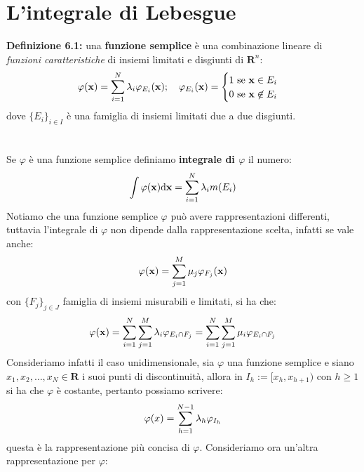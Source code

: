\documentclass{article}
\begin{document}
\section{L'integrale di Lebesgue}
\textbf{Definizione 6.1:} una \textbf{funzione semplice} è una combinazione lineare di \textit{funzioni caratteristiche} di insiemi limitati e disgiunti di $\mathbf{R}^n$:
\begin{gather}
    \varphi(\mathbf{x}) = \sum_{i = 1}^N \lambda_i \varphi_{E_i}(\mathbf{x}); \quad
    \varphi_{E_i}(\mathbf{x}) = \begin{cases}
        1 \text{ se } \mathbf{x} \in E_i \\
        0 \text{ se } \mathbf{x} \not\in E_i \notag
    \end{cases}
\end{gather}
dove $\{ E_i \}_{i \in I}$ è una famiglia di insiemi limitati due a due disgiunti. \\ \\ \\
Se $\varphi$ è una funzione semplice definiamo \textbf{integrale di $\varphi$} il numero:
\begin{align}
    \int \varphi(\mathbf{x}) \mathrm{d}\mathbf{x} = \sum_{i = 1}^N \lambda_i m(E_i) \notag
\end{align}
Notiamo che una funzione semplice $\varphi$ può avere rappresentazioni differenti, tuttavia l'integrale di $\varphi$ non dipende dalla rappresentazione scelta, infatti se vale anche:
\begin{align}
    \varphi(\mathbf{x}) = \sum_{j = 1}^M \mu_j \varphi_{F_j}(\mathbf{x}) \notag
\end{align}
con $\{ F_j \}_{j \in J}$ famiglia di insiemi misurabili e limitati, si ha che:
\begin{align}
    \varphi(\mathbf{x}) = \sum_{i = 1}^N \sum_{j = 1}^M \lambda_i \varphi_{E_i \cap F_j} = \sum_{i = 1}^N \sum_{j = 1}^M \mu_i \varphi_{E_i \cap F_j} \notag
\end{align}
Consideriamo infatti il caso unidimensionale, sia $\varphi$ una funzione semplice e siano \\ $x_1, x_2, \dots, x_N \in \mathbf{R}$ i suoi punti di discontinuità, allora in $I_h := [x_h, x_{h + 1})$ con $h \geq 1$ si ha che $\varphi$ è costante, pertanto possiamo scrivere:
\begin{align}
    \varphi(x) = \sum_{h = 1}^{N - 1} \lambda_h \varphi_{I_h} \notag
\end{align}
questa è la rappresentazione più concisa di $\varphi$. Consideriamo ora un'altra rappresentazione per $\varphi$:
\end{document}
